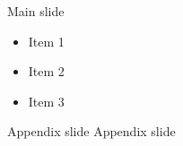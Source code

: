 \documentclass{beamer}
\begin{document}
\begin{frame}{Main slide}
\begin{itemize}[<+->]
    \item Item 1
    \item Item 2
    \item Item 3\hypertarget<3>{main}{} 
\end{itemize}

\hyperlink{appendix}{}
\end{frame}


\begin{frame}[label=appendix]{Appendix slide} %
    Appendix slide
  \hyperlink{main}{}
\end{frame}
\end{document}
